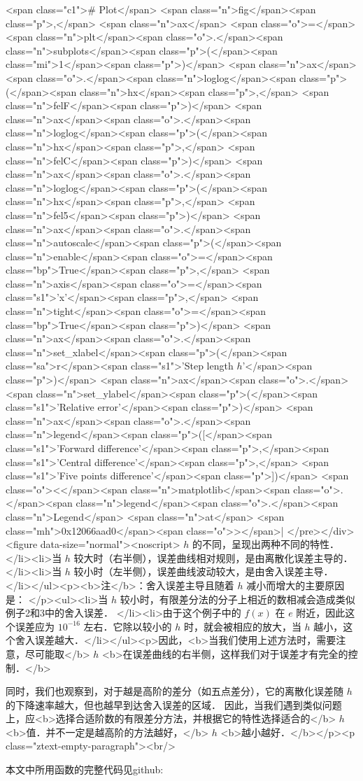<span class="c1"># Plot</span>
<span class="n">fig</span><span class="p">,</span> <span class="n">ax</span> <span class="o">=</span> <span class="n">plt</span><span class="o">.</span><span class="n">subplots</span><span class="p">(</span><span class="mi">1</span><span class="p">)</span>
<span class="n">ax</span><span class="o">.</span><span class="n">loglog</span><span class="p">(</span><span class="n">hx</span><span class="p">,</span> <span class="n">felF</span><span class="p">)</span>
<span class="n">ax</span><span class="o">.</span><span class="n">loglog</span><span class="p">(</span><span class="n">hx</span><span class="p">,</span> <span class="n">felC</span><span class="p">)</span>
<span class="n">ax</span><span class="o">.</span><span class="n">loglog</span><span class="p">(</span><span class="n">hx</span><span class="p">,</span> <span class="n">fel5</span><span class="p">)</span>
<span class="n">ax</span><span class="o">.</span><span class="n">autoscale</span><span class="p">(</span><span class="n">enable</span><span class="o">=</span><span class="bp">True</span><span class="p">,</span> <span class="n">axis</span><span class="o">=</span><span class="s1">'x'</span><span class="p">,</span> <span class="n">tight</span><span class="o">=</span><span class="bp">True</span><span class="p">)</span>
<span class="n">ax</span><span class="o">.</span><span class="n">set_xlabel</span><span class="p">(</span><span class="sa">r</span><span class="s1">'Step length $h$'</span><span class="p">)</span>
<span class="n">ax</span><span class="o">.</span><span class="n">set_ylabel</span><span class="p">(</span><span class="s1">'Relative error'</span><span class="p">)</span>
<span class="n">ax</span><span class="o">.</span><span class="n">legend</span><span class="p">([</span><span class="s1">'Forward difference'</span><span class="p">,</span><span class="s1">'Central difference'</span><span class="p">,</span> <span class="s1">'Five points difference'</span><span class="p">])</span>
<span class="o"><</span><span class="n">matplotlib</span><span class="o">.</span><span class="n">legend</span><span class="o">.</span><span class="n">Legend</span> <span class="n">at</span> <span class="mh">0x12066aad0</span><span class="o">></span>| </pre></div><figure data-size="normal"><noscript> $h$  的不同，呈现出两种不同的特性．  </li><li>当  $h$  较大时（右半侧），误差曲线相对规则，是由离散化误差主导的． </li><li>当  $h$  较小时（左半侧），误差曲线波动较大，是由舍入误差主导．</li></ul><p><b>注</b>：舍入误差主导且随着  $h$  减小而增大的主要原因是： </p><ul><li>当  $h$  较小时，有限差分法的分子上相近的数相减会造成类似例子2和3中的舍入误差．  </li><li>由于这个例子中的  $f(x)$  在  $e$  附近，因此这个误差应为  $10^{-16}$  左右．它除以较小的  $h$  时，就会被相应的放大，当  $h$  越小，这个舍入误差越大．</li></ul><p>因此，<b>当我们使用上述方法时，需要注意，尽可能取</b>  $h$  <b>在误差曲线的右半侧，这样我们对于误差才有完全的控制．</b>

同时，我们也观察到，对于越是高阶的差分（如五点差分），它的离散化误差随  $h$  的下降速率越大，但也越早到达舍入误差的区域． 因此，当我们遇到类似问题上，应<b>选择合适阶数的有限差分方法，并根据它的特性选择适合的</b>  $h$  <b>值．并不一定是越高阶的方法越好，</b>  $h$  <b>越小越好．</b></p><p class="ztext-empty-paragraph"><br/>

本文中所用函数的完整代码见github: